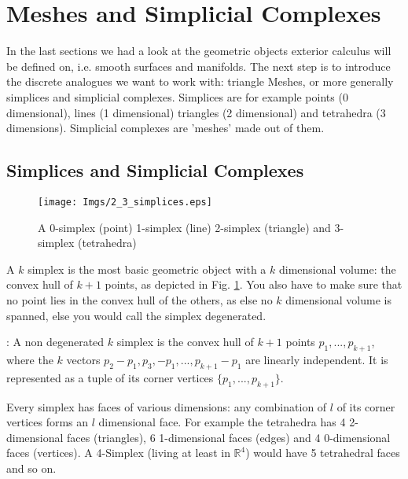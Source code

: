 \newpage
\section{Meshes and Simplicial Complexes}

In the last sections we had a look at the geometric objects exterior calculus will be defined on, i.e. smooth surfaces and manifolds. The next step is to introduce the discrete analogues we want to work with: triangle Meshes, or more generally simplices and simplicial complexes. Simplices are for example points (0 dimensional), lines (1 dimensional) triangles (2 dimensional) and tetrahedra (3 dimensions). Simplicial complexes are 'meshes' made out of them.

\subsection{Simplices and Simplicial Complexes}

\begin{figure}[b]
\begin{center}
\texttt{[image: Imgs/2\_3\_simplices.eps]}
\end{center}
\caption{A 0-simplex (point) 1-simplex (line) 2-simplex (triangle) and 3-simplex (tetrahedra) }
\label{fig::2_3_simplices}
\end{figure}

A $k$ simplex is the most basic geometric object with a $k$ dimensional volume: the convex hull of $k+1$ points, as depicted in Fig. \ref{fig::2_3_simplices}. You also have to make sure that no point lies in the convex hull of the others, as else no $k$ dimensional volume is spanned, else you would call the simplex degenerated.

\begin{definition}[Simplex]: A non degenerated $k$ simplex is the convex hull of $k + 1$ points $p_1,...,p_{k+1}$, where the $k$ vectors $p_2 -p_1, p_3,-p_1, ..., p_{k+1} -p_1$ are linearly independent. It is represented as a tuple of its corner vertices $\{p_1,...,p_{k+1}\}$.
\end{definition}

Every simplex has faces of various dimensions: any combination of $l$ of its corner vertices forms an $l$ dimensional face. For example the tetrahedra has 4 2-dimensional faces (triangles), 6 1-dimensional faces (edges) and 4 0-dimensional faces (vertices). A 4-Simplex (living at least in $\mathbb R^4$) would have 5 tetrahedral faces and so on.

